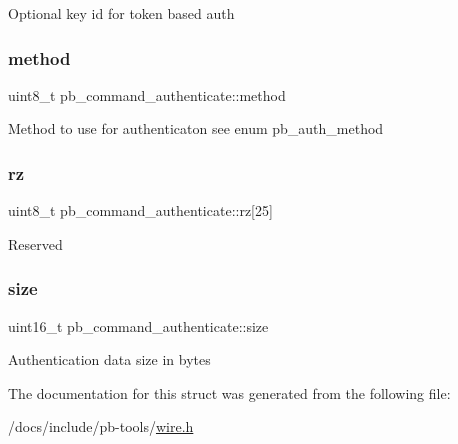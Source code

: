 Optional key id for token based auth \mbox{\label{structpb__command__authenticate_acd90b94a995d430da2a6852990f4c97e}} 
\subsubsection{\texorpdfstring{method}{method}}
{\footnotesize\ttfamily uint8\+\_\+t pb\+\_\+command\+\_\+authenticate\+::method}

Method to use for authenticaton see enum pb\+\_\+auth\+\_\+method \mbox{\label{structpb__command__authenticate_a8946e60668166aff43b462f59f168828}} 
\subsubsection{\texorpdfstring{rz}{rz}}
{\footnotesize\ttfamily uint8\+\_\+t pb\+\_\+command\+\_\+authenticate\+::rz\mbox{[}25\mbox{]}}

Reserved \mbox{\label{structpb__command__authenticate_a3d67499c136e9580c2670d4e11ebd8c3}} 
\subsubsection{\texorpdfstring{size}{size}}
{\footnotesize\ttfamily uint16\+\_\+t pb\+\_\+command\+\_\+authenticate\+::size}

Authentication data size in bytes 

The documentation for this struct was generated from the following file\+:\begin{DoxyCompactItemize}
\item 
/docs/include/pb-\/tools/\hyperlink{wire_8h}{wire.\+h}\end{DoxyCompactItemize}

